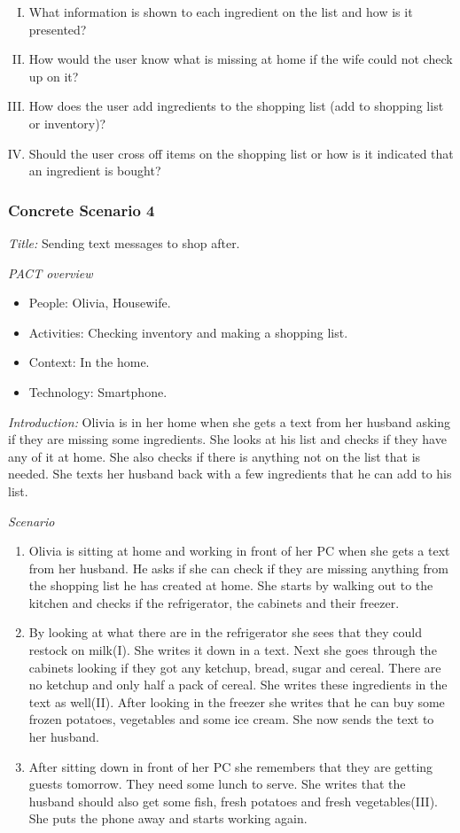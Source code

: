 \begin{enumerate} [(I)]
\item What information is shown to each ingredient on the list and how is it presented?
\item How would the user know what is missing at home if the wife could not check up on it?
\item How does the user add ingredients to the shopping list (add to shopping list or inventory)?
\item Should the user cross off items on the shopping list or how is it indicated that an ingredient is bought? 
\end{enumerate}

\subsubsection{Concrete Scenario 4} \label{ConcreteScenario4}

\emph{Title:} Sending text messages to shop after.

\emph{PACT overview}
\begin{itemize}
\item People: Olivia, Housewife.  
\item Activities: Checking inventory and making a shopping list.
\item Context: In the home.
\item Technology: Smartphone.  
\end{itemize}

\emph{Introduction:} Olivia is in her home when she gets a text from her husband asking if they are missing some ingredients. She looks at his list and checks if they have any of it at home. She also checks if there is anything not on the list that is needed. She texts her husband back with a few ingredients that he can add to his list.

\emph{Scenario}
\begin{enumerate}
\item Olivia is sitting at home and working in front of her PC when she gets a text from her husband. He asks if she can check if they are missing anything from the shopping list he has created at home. She starts by walking out to the kitchen and checks if the refrigerator, the cabinets and their freezer.
\item By looking at what there are in the refrigerator she sees that they could restock on milk(I). She writes it down in a text. Next she goes through the cabinets looking if they got any ketchup, bread, sugar and cereal. There are no ketchup and only half a pack of cereal. She writes these ingredients in the text as well(II). After looking in the freezer she writes that he can buy some frozen potatoes, vegetables and some ice cream. She now sends the text to her husband.  
\item After sitting down in front of her PC she remembers that they are getting guests tomorrow. They need some lunch to serve. She writes that the husband should also get some fish, fresh potatoes and fresh vegetables(III). She puts the phone away and starts working again. 
\end{enumerate}

